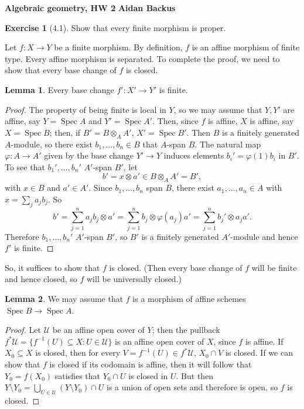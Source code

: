 \documentclass[10pt]{article}
\newcommand{\Spec}{\operatorname{Spec}}
\theoremstyle{definition}
\newtheorem{exer}{Exercise}
\newtheorem{lemma}{Lemma}[exer]
\begin{document}
\noindent
\large\textbf{Algebraic geometry, HW 2} \hfill \textbf{Aidan Backus} \\

\begin{exer}[4.1]
Show that every finite morphism is proper.
\end{exer}

Let $f: X \to Y$ be a finite morphism.
By definition, $f$ is an affine morphism of finite type.
Every affine morphism is separated.
To complete the proof, we need to show that every base change of $f$ is closed.

\begin{lemma}
Every base change $f': X' \to Y'$ is finite.
\end{lemma}
\begin{proof}
The property of being finite is local in $Y$, so we may assume that $Y, Y'$ are affine, say $Y = \Spec A$ and $Y' = \Spec A'$.
Then, since $f$ is affine, $X$ is affine, say $X = \Spec B$; then, if $B' = B \otimes_A A'$, $X' = \Spec B'$.
Then $B$ is a finitely generated $A$-module, so there exist $b_1, \dots, b_n \in B$ that $A$-span $B$.
The natural map $\varphi: A \to A'$ given by the base change $Y' \to Y$ induces elements $b_i' = \varphi(1)b_i$ in $B'$.
To see that $b_1', \dots, b_n'$ $A'$-span $B'$, let
$$b' = x \otimes a' \in B \otimes_A A' = B',$$
with $x \in B$ and $a' \in A'$.
Since $b_1, \dots, b_n$ span $B$, there exist $a_1, \dots, a_n \in A$ with $x = \sum_j a_j b_j$.
So
$$b' = \sum_{j=1}^n a_j b_j \otimes a' = \sum_{j=1}^n b_j \otimes \varphi(a_j) a' = \sum_{j=1}^n b_j' \otimes a_j a'.$$
Therefore $b_1, \dots, b_n'$ $A'$-span $B'$, so $B'$ is a finitely generated $A'$-module and hence $f'$ is finite.
\end{proof}

So, it suffices to show that $f$ is closed.
(Then every base change of $f$ will be finite and hence closed, so $f$ will be universally closed.)

\begin{lemma}
We may assume that $f$ is a morphism of affine schemes $\Spec B \to \Spec A$.
\end{lemma}
\begin{proof}
Let $\mathcal U$ be an affine open cover of $Y$; then the pullback $f^* \mathcal U = \{f^{-1}(U) \subseteq X: U \in \mathcal U\}$ is an affine open cover of $X$, since $f$ is affine.
If $X_0 \subseteq X$ is closed, then for every $V = f^{-1}(U) \in f^* \mathcal U$, $X_0 \cap V$ is closed.
If we can show that $f$ is closed if its codomain is affine, then it will follow that $Y_0 = f(X_0)$ satisfies that $Y_0 \cap U$ is closed in $U$.
But then $Y \setminus Y_0 = \bigcup_{U \in \mathcal U} (Y \setminus Y_0) \cap U$ is a union of open sets and therefore is open, so $f$ is closed.
\end{proof}
\end{document}
